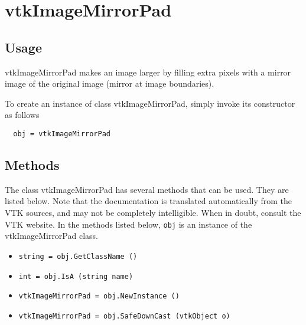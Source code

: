 \section{vtkImageMirrorPad}

\subsection{Usage}

 vtkImageMirrorPad makes an image larger by filling extra pixels with
 a mirror image of the original image (mirror at image boundaries).  

To create an instance of class vtkImageMirrorPad, simply
invoke its constructor as follows
\begin{verbatim}
  obj = vtkImageMirrorPad
\end{verbatim}
\subsection{Methods}

The class vtkImageMirrorPad has several methods that can be used.
  They are listed below.
Note that the documentation is translated automatically from the VTK sources,
and may not be completely intelligible.  When in doubt, consult the VTK website.
In the methods listed below, \verb|obj| is an instance of the vtkImageMirrorPad class.
\begin{itemize}
\item  \verb|string = obj.GetClassName ()|

\item  \verb|int = obj.IsA (string name)|

\item  \verb|vtkImageMirrorPad = obj.NewInstance ()|

\item  \verb|vtkImageMirrorPad = obj.SafeDownCast (vtkObject o)|

\end{itemize}
